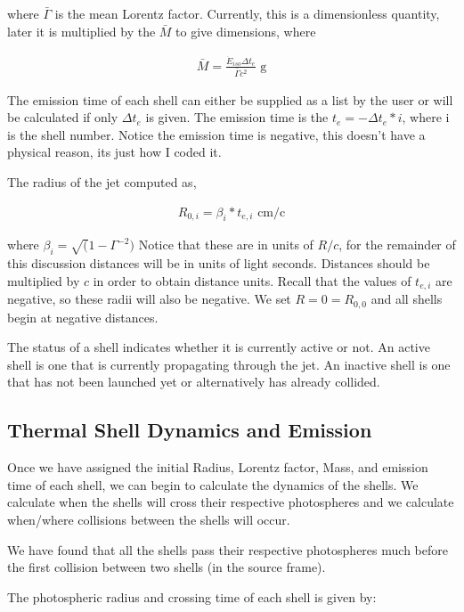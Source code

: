 \documentclass[linenumbers]{aastex631}
\begin{document}
where $\bar{\Gamma}$ is the mean Lorentz factor. Currently, this is a dimensionless quantity, later it is multiplied by the $\bar{M}$ to give dimensions, where

\begin{align}
\bar{M} = \frac{\dot{E}_{iso} \Delta t_e}{\bar{\Gamma}c^2} \text{ g}
\end{align}

The emission time of each shell can either be supplied as a list by the user or will be calculated if only $\Delta t_e$ is given. The emission time is the $t_e = -\Delta t_e * i$, where i is the shell number. Notice the emission time is negative, this doesn't have a physical reason, its just how I coded it. 

The radius of the jet computed as,

\begin{align}
	R_{0,i} = \beta_i * t_{e,i}\text{ cm/c}
\end{align}

where $\beta_i = \sqrt(1 - \Gamma^{-2})$ Notice that these are in units of $R/c$, for the remainder of this discussion distances will be in units of light seconds. Distances should be multiplied by $c$ in order to obtain distance units. Recall that the values of $t_{e,i}$ are negative, so these radii will also be negative. We set $R = 0 = R_{0,0}$ and all shells begin at negative distances.

The status of a shell indicates whether it is currently active or not. An active shell is one that is currently propagating through the jet. An inactive shell is one that has not been launched yet or alternatively has already collided. 

\subsection{Thermal Shell Dynamics and Emission}

Once we have assigned the initial Radius, Lorentz factor, Mass, and emission time of each shell, we can begin to calculate the dynamics of the shells. We calculate when the shells will cross their respective photospheres and we calculate when/where collisions between the shells will occur. 

We have found that all the shells pass their respective photospheres much before the first collision between two shells (in the source frame).

The photospheric radius and crossing time of each shell is given by:
\end{document}
